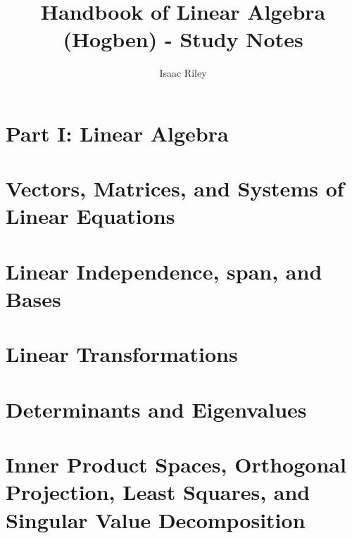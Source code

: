 \documentclass[a4paper]{article}
\title{Handbook of Linear Algebra (Hogben) - Study Notes}
\author{Isaac Riley}
\begin{document}
\maketitle
\tableofcontents
\newpage

\section*{Part I: Linear Algebra}

\section{Vectors, Matrices, and Systems of Linear Equations}

\subsection{}

\subsubsection{}


\section{Linear Independence, span, and Bases}

\section{Linear Transformations}

\section{Determinants and Eigenvalues}

\section{Inner Product Spaces, Orthogonal Projection,
Least Squares, and Singular Value Decomposition}
\end{document}
